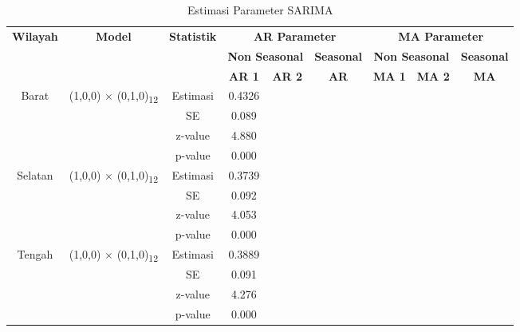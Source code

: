 \begin{table}[H]
    \centering
    \tiny
    \caption{Estimasi Parameter SARIMA}
    \label{table:estimasi-parameter-arima}
    \renewcommand{\arraystretch}{1.3}
    \begin{tabular}{|c|c|c|c|c|c|c|c|c|}
        \hline
        \multirow{3}{*}{\textbf{Wilayah}} &
        \multirow{3}{*}{\textbf{Model}} &
        \multirow{3}{*}{\textbf{Statistik}} &
        \multicolumn{3}{c|}{\textbf{AR Parameter}} &
        \multicolumn{3}{c|}{\textbf{MA Parameter}} \\
        \cline{4-9}

        & & &
        \multicolumn{2}{c|}{\textbf{Non Seasonal}} &
        \textbf{Seasonal} &
        \multicolumn{2}{c|}{\textbf{Non Seasonal}} &
        \textbf{Seasonal} \\
        \cline{4-9}

        & & &
        \textbf{AR 1} & \textbf{AR 2} & \textbf{AR} &
        \textbf{MA 1} & \textbf{MA 2} & \textbf{MA} \\
        \hline

        \multirow{4}{*}{Barat}
        & \multirow{4}{*}{(1,0,0) × (0,1,0)\textsubscript{12}}
        & Estimasi & 0.4326 &  &  &  &  &  \\ \cline{3-9}
        &  & SE       & 0.089  &  &  &  &  &  \\ \cline{3-9}
        &  & z-value  & 4.880 &  &  &  &  &  \\ \cline{3-9}
        &  & p-value  & 0.000  &  &  &  &  &  \\ \hline

        \multirow{4}{*}{Selatan}
        & \multirow{4}{*}{(1,0,0) × (0,1,0)\textsubscript{12}}
        & Estimasi & 0.3739 &  &  &  &  &  \\ \cline{3-9}
        &  & SE       & 0.092 &  &  &  &  &  \\ \cline{3-9}
        &  & z-value  & 4.053 &  &  &  &  &  \\ \cline{3-9}
        &  & p-value  & 0.000  &  &  &  &  &  \\ \hline

        \multirow{4}{*}{Tengah}
        & \multirow{4}{*}{(1,0,0) × (0,1,0)\textsubscript{12}}
        & Estimasi & 0.3889 &  &  &  &  &  \\ \cline{3-9}
        &  & SE       & 0.091  &  &   &  &  &  \\ \cline{3-9}
        &  & z-value  & 4.276 &  &  &  &  &  \\ \cline{3-9}
        &  & p-value  & 0.000  &  &   &  &  &  \\ \hline


\end{tabular}
\end{table}
